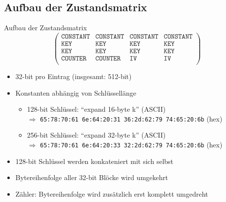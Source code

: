\documentclass{beamer}
\begin{document}
\subsection{Aufbau der Zustandsmatrix}
\begin{frame}{Aufbau der Zustandsmatrix}
\begin{equation*}
\begin{pmatrix}
\texttt{CONSTANT}& \texttt{CONSTANT} & \texttt{CONSTANT} & \texttt{CONSTANT} \\
\texttt{KEY} & \texttt{KEY} & \texttt{KEY} & \texttt{KEY} \\
\texttt{KEY} & \texttt{KEY} & \texttt{KEY} & \texttt{KEY} \\
\texttt{COUNTER} & \texttt{COUNTER} & \texttt{IV} & \texttt{IV} \\
\end{pmatrix}
\end{equation*}
\begin{itemize}
\item 32-bit pro Eintrag (insgesamt: 512-bit)
\item Konstanten abhängig von Schlüssellänge
\begin{itemize}
\item 128-bit Schlüssel: ``expand 16-byte k'' (ASCII) \\
$\Rightarrow$ \texttt{65:78:70:61 6e:64:20:31 36:2d:62:79 74:65:20:6b} (hex)
\item 256-bit Schlüssel: ``expand 32-byte k'' (ASCII) \\
$\Rightarrow$ \texttt{65:78:70:61 6e:64:20:33 32:2d:62:79 74:65:20:6b} (hex)
\end{itemize}
\item 128-bit Schlüssel werden konkateniert mit sich selbst
\item Bytereihenfolge aller 32-bit Blöcke wird umgekehrt
\item Zähler: Bytereihenfolge wird zusätzlich erst komplett umgedreht
\end{itemize}
\end{frame}
\end{document}
